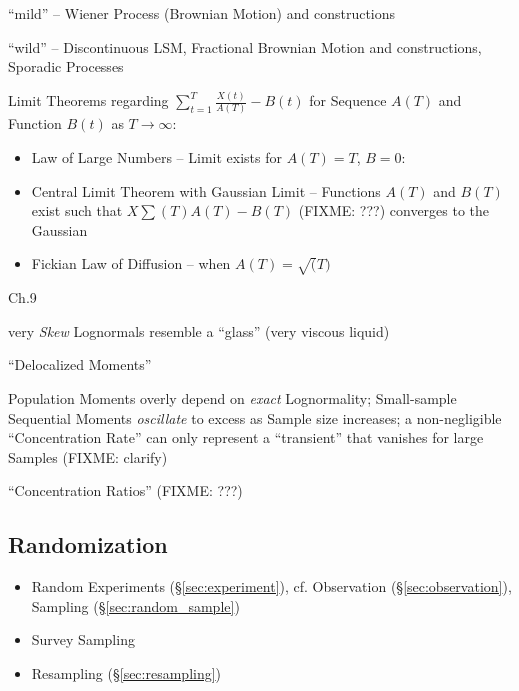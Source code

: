 ``mild'' -- Wiener Process (Brownian Motion) and constructions

``wild'' -- Discontinuous LSM, Fractional Brownian Motion and constructions,
Sporadic Processes

Limit Theorems regarding $\sum_{t=1}^T \frac{X(t)}{A(T)} - B(t)$ for Sequence
$A(T)$ and Function $B(t)$ as $T \to \infty$:
\begin{itemize}
  \item Law of Large Numbers -- Limit exists for $A(T) = T$, $B = 0$:
  \item Central Limit Theorem with Gaussian Limit -- Functions $A(T)$ and $B(T)$
    exist such that $X \sum(T)A(T) - B(T)$ (FIXME: ???) converges to the
    Gaussian
  \item Fickian Law of Diffusion -- when $A(T) = \sqrt(T)$
\end{itemize}

Ch.9

very \emph{Skew} Lognormals resemble a ``glass'' (very viscous liquid)

``Delocalized Moments''

Population Moments overly depend on \emph{exact} Lognormality; Small-sample
Sequential Moments \emph{oscillate} to excess as Sample size increases; a
non-negligible ``Concentration Rate'' can only represent a ``transient'' that
vanishes for large Samples (FIXME: clarify)

``Concentration Ratios'' (FIXME: ???)



\subsection{Randomization}\label{sec:randomization}

\begin{itemize}
  \item Random Experiments (\S\ref{sec:experiment}), cf. Observation
    (\S\ref{sec:observation}), Sampling (\S\ref{sec:random_sample})
  \item Survey Sampling
  \item Resampling (\S\ref{sec:resampling})
\end{itemize}



